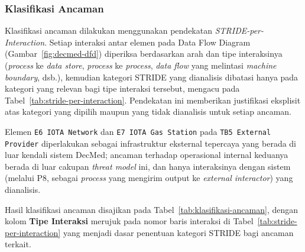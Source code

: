 \subsubsection{Klasifikasi Ancaman}

Klasifikasi ancaman dilakukan menggunakan pendekatan \textit{STRIDE-per-Interaction}. Setiap interaksi antar elemen pada Data Flow Diagram (Gambar~\ref{fig:decmed-dfd}) diperiksa berdasarkan arah dan tipe interaksinya (\textit{process} ke \textit{data store}, \textit{process} ke \textit{process}, \textit{data flow} yang melintasi \textit{machine boundary}, dsb.), kemudian kategori STRIDE yang dianalisis dibatasi hanya pada kategori yang relevan bagi tipe interaksi tersebut, mengacu pada Tabel~\ref{tab:stride-per-interaction}. Pendekatan ini memberikan justifikasi eksplisit atas kategori yang dipilih maupun yang tidak dianalisis untuk setiap ancaman.

Elemen \texttt{E6 IOTA Network} dan \texttt{E7 IOTA Gas Station} pada \texttt{TB5 External Provider} diperlakukan sebagai infrastruktur eksternal tepercaya yang berada di luar kendali sistem DecMed; ancaman terhadap operasional internal keduanya berada di luar cakupan \textit{threat model} ini, dan hanya interaksinya dengan sistem (melalui P8, sebagai \textit{process} yang mengirim output ke \textit{external interactor}) yang dianalisis.

Hasil klasifikasi ancaman disajikan pada Tabel~\ref{tab:klasifikasi-ancaman}, dengan kolom \textbf{Tipe Interaksi} merujuk pada nomor baris interaksi di Tabel~\ref{tab:stride-per-interaction} yang menjadi dasar penentuan kategori STRIDE bagi ancaman terkait.

